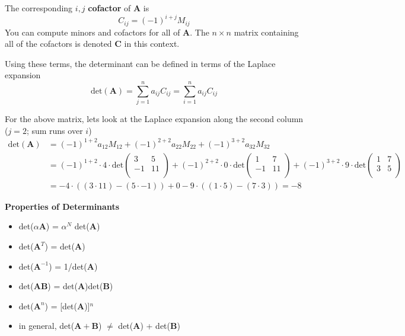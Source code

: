 \documentclass[12pt]{article}
\newcommand{\ve}[1]{\ensuremath{\mathbf{#1}}}
\begin{document}
The corresponding $i,j$ \textbf{cofactor} of $\ve{A}$ is
%
\begin{equation}
C_{ij} = (-1)^{i+j} M_{ij} \nonumber
\end{equation}
%
You can compute minors and cofactors for all of $\ve{A}$. The $n \times n$ matrix containing all of the cofactors is denoted $\ve{C}$ in this context.

Using these terms, the determinant can be defined in terms of the Laplace expansion
%
\begin{equation}
\text{det}(\ve{A}) = \sum_{j=1}^n a_{ij} C_{ij} = \sum_{i=1}^n a_{ij} C_{ij} \nonumber
\end{equation}

For the above matrix, lets look at the Laplace expansion along the second column ($j = 2$; sum runs over $i$)
\begin{align}
\text{det}(\ve{A}) &= (-1)^{1+2} a_{12} M_{12} + (-1)^{2+2} a_{22} M_{22} + (-1)^{3+2} a_{32} M_{32} \nonumber \\
%
&= (-1)^{1+2} \cdot 4 \cdot \text{det}\begin{pmatrix}
        3 & 5 \\
        -1 & 11 \\ \end{pmatrix} + (-1)^{2+2} \cdot 0 \cdot \text{det}\begin{pmatrix} 
        1 & 7 \\
        -1 & 11 \\ \end{pmatrix} + (-1)^{3+2} \cdot 9 \cdot \text{det}\begin{pmatrix} 
        1 & 7 \\
        3 & 5 \\\end{pmatrix} \nonumber \\
%
&= -4 \cdot ((3 \cdot 11) - (5 \cdot -1)) + 0 -9 \cdot ((1 \cdot 5) - (7 \cdot 3)) = -8 \nonumber
\end{align}


\textbf{Properties of Determinants}
\begin{itemize}
\item det($\alpha\ve{A}$) = $\alpha^N$ det($\ve{A}$)

\item det($\ve{A}^T$) = det($\ve{A}$)

\item det($\ve{A}^{-1}$) = 1/det($\ve{A}$)

\item det($\ve{AB}$) = det($\ve{A}$)det($\ve{B}$)

\item det($\ve{A}^n$) = [det($\ve{A}$)]$^n$

\item in general, det($\ve{A + B}$) $\neq$ det($\ve{A}$) + det($\ve{B}$) 
\end{itemize}
\end{document}
